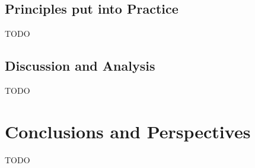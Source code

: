 \documentclass{chi-ext}
\begin{document}
\subsection{Principles put into Practice}
TODO

\subsection{Discussion and Analysis}
TODO

\section{Conclusions and Perspectives}
TODO

\balance


\end{document}
